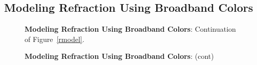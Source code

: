 \documentclass[DM,toc]{lsstdoc}
\begin{document}
\subsection{Modeling Refraction Using Broadband Colors \label{appx:rmodel}}
\begin{figure}[h]
    \centering
    \caption[]{{\bf Modeling Refraction Using Broadband Colors}: Continuation of Figure~\ref{rmodel}.}
    \label{rmodel2}
\end{figure}
\begin{figure}
    \ContinuedFloat
    \centering
    \caption[]{{\bf Modeling Refraction Using Broadband Colors}: (cont)}
    \label{rmodel2}
\end{figure}
\end{document}
